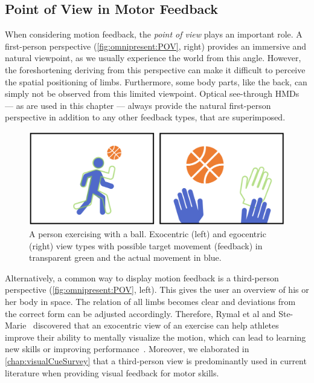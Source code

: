 \subsection{Point of View in Motor Feedback\label{sec:omnipresent:POV}}
When considering motion feedback, the \emph{point of view} plays an important role. A first-person perspective (\autoref{fig:omnipresent:POV}, right) provides an immersive and natural viewpoint, as we usually experience the world from this angle. However, the foreshortening deriving from this perspective can make it difficult to perceive the spatial positioning of limbs. Furthermore, some body parts, like the back, can simply not be observed from this limited viewpoint. 
Optical see-through HMDs --- as are used in this chapter --- always provide the natural first-person perspective in addition to any other feedback types, that are superimposed.

\begin{figure}[h!]
	\centering
	\includegraphics[width=\linewidth]{pictures/PointOfView.PNG}
	\caption{A person exercising with a ball. Exocentric (left) and egocentric (right) view types with possible target movement (feedback) in transparent green and the actual movement in blue.\label{fig:omnipresent:POV}}
\end{figure}

Alternatively, a common way to display motion feedback is a third-person perspective (\autoref{fig:omnipresent:POV}, left). This gives the user an overview of his or her body in space. The relation of all limbs becomes clear and deviations from the correct form can be adjusted accordingly. Therefore, Rymal et al and Ste-Marie~\cite{rymal2009dsm} discovered that an exocentric view of an exercise can help athletes improve their ability to mentally visualize the motion, which can lead to learning new skills or improving performance~\cite{white1998ida}. Moreover, we elaborated in \autoref{chap:visualCueSurvey} that a third-person view is predominantly used in current literature when providing visual feedback for motor skills.

